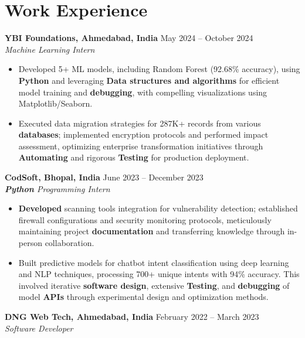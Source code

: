 \documentclass[a4paper,10pt]{article}
\begin{document}
\section*{Work Experience}
\textbf{YBI Foundations, Ahmedabad, India} \hfill May 2024 -- October 2024\\
\textit{Machine Learning Intern} \\
\begin{itemize}[leftmargin=*, itemsep=0pt, parsep=1pt]
\vspace{-6mm}
\item Developed 5+ ML models, including Random Forest (92.68\% accuracy), using \textbf{Python} and leveraging \textbf{Data structures and algorithms} for efficient model training and \textbf{debugging}, with compelling visualizations using Matplotlib/Seaborn.
\item Executed data migration strategies for 287K+ records from various \textbf{databases}; implemented encryption protocols and performed impact assessment, optimizing enterprise transformation initiatives through \textbf{Automating} and rigorous \textbf{Testing} for production deployment.
\end{itemize}
\textbf{CodSoft, Bhopal, India} \hfill June 2023 -- December 2023\\
\textit{\textbf{Python} Programming Intern} \\
\begin{itemize}[leftmargin=*, itemsep=0pt, parsep=1pt]
\vspace{-6mm}
\item \textbf{Developed} scanning tools integration for vulnerability detection; established firewall configurations and security monitoring protocols, meticulously maintaining project \textbf{documentation} and transferring knowledge through in-person collaboration.
\item Built predictive models for chatbot intent classification using deep learning and NLP techniques, processing 700+ unique intents with 94\% accuracy. This involved iterative \textbf{software design}, extensive \textbf{Testing}, and \textbf{debugging} of model \textbf{APIs} through experimental design and optimization methods.
\vspace{-1mm}
\end{itemize}

\textbf{DNG Web Tech, Ahmedabad, India} \hfill February 2022 -- March 2023 \\
\textit{Software Developer} \\
\end{document}
